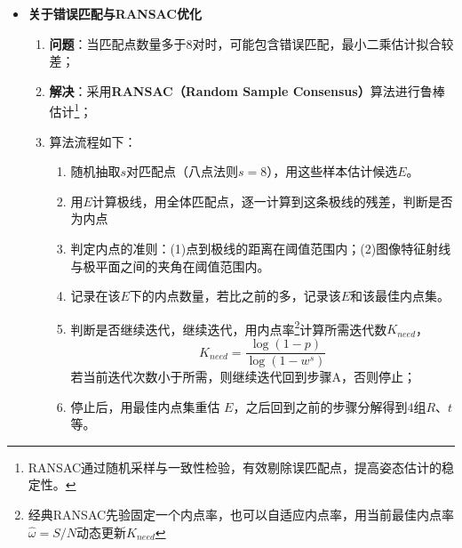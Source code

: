 \documentclass[../main.tex]{subfiles}
\begin{document}
\begin{enumerate}
\begin{itemize}
\begin{enumerate}
\begin{itemize}
\begin{itemize}
\begin{small}
\begin{itemize}
        ==============================
        \item \textbf{关于错误匹配与RANSAC优化}
        \begin{enumerate}
            \item \textbf{问题}：当匹配点数量多于8对时，可能包含错误匹配，最小二乘估计拟合较差；
            \item \textbf{解决}：采用\textbf{RANSAC（Random Sample Consensus）}算法进行鲁棒估计\footnote{RANSAC通过随机采样与一致性检验，有效剔除误匹配点，提高姿态估计的稳定性。}；
            \item 算法流程如下：
            \begin{enumerate}
              \item 随机抽取$s$对匹配点（八点法则$s=8$），用这些样本估计候选$E$。
              \item 用$E$计算极线，用全体匹配点，逐一计算到这条极线的残差，判断是否为内点
              \item 判定内点的准则：(1)点到极线的距离在阈值范围内；(2)图像特征射线与极平面之间的夹角在阈值范围内。
              \item 记录在该$E$下的内点数量，若比之前的多，记录该$E$和该最佳内点集。
              \item 判断是否继续迭代，继续迭代，用内点率\footnote{经典RANSAC先验固定一个内点率，也可以自适应内点率，用当前最佳内点率$\hat\omega=S/N$动态更新$K_{need}$}计算所需迭代数$K_{need}$，
              $$K_{need} = \frac{\log(1-p)}{\log(1-w^s)}$$
              若当前迭代次数小于所需，则继续迭代回到步骤A，否则停止；
              \item 停止后，用最佳内点集重估 \(E\)，之后回到之前的步骤分解得到4组$R$、$t$等。
            \end{enumerate}
            \label{RANSAC_example}

\end{enumerate}
\end{itemize}
\end{small}
\end{itemize}
\end{itemize}
\end{enumerate}
\end{itemize}
\end{enumerate}
\end{document}
